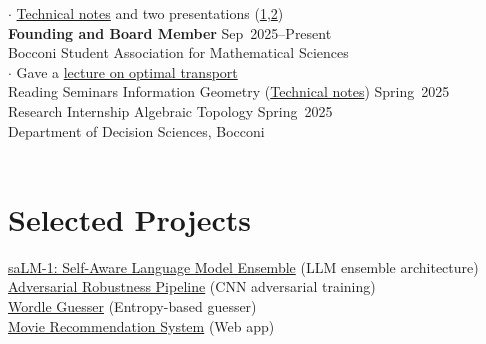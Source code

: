 \documentclass[margin,line]{res}
\begin{document}
\begin{resume}
{\small $\cdot$ \href{https://matildedol.github.io/files/Ricci.pdf}{Technical notes} and two presentations (\href{https://matildedol.github.io/files/Sliding_Ricci}{1},\href{https://matildedol.github.io/files/Sliding_Soboleb}{2})
\vspace{2mm}}\\
{\bf Founding and Board Member}
\hfill Sep~2025--Present\vspace*{0.7mm}\\
{ Bocconi Student Association for Mathematical Sciences}\vspace*{0.5mm}\\
{\small $\cdot$ Gave a \href{https://matildedol.github.io/files/ot_bams.pdf}{lecture on optimal transport}}\vspace{2mm}\\
{Reading Seminars Information Geometry} {\small (\href{https://matildedol.github.io/files/info_geo.pdf}{Technical notes})}
\hfill Spring~2025\vspace*{1mm}\\
{Research Internship Algebraic Topology}
\hfill Spring~2025\vspace*{1mm}\\ 
{ Department of Decision Sciences, Bocconi}\\
\vspace*{-0.8cm}\\


\section{\sc Selected Projects }
\href{https://github.com/riccardoalberghi/saLM-1}{saLM-1: Self-Aware Language Model Ensemble} (LLM ensemble architecture)\\
\href{https://github.com/kassymm/cv_project}{Adversarial Robustness Pipeline} (CNN adversarial training) \\
\href{https://github.com/matildedol/projects-bocconi/blob/main/wordle-guesser/README.md}{Wordle Guesser} (Entropy-based guesser)
\\
 \href{https://github.com/beatricecitterio/movie-recommendation.git}{Movie Recommendation System} (Web app)
\vspace*{-0.5cm}\\

\end{resume}
\end{document}
